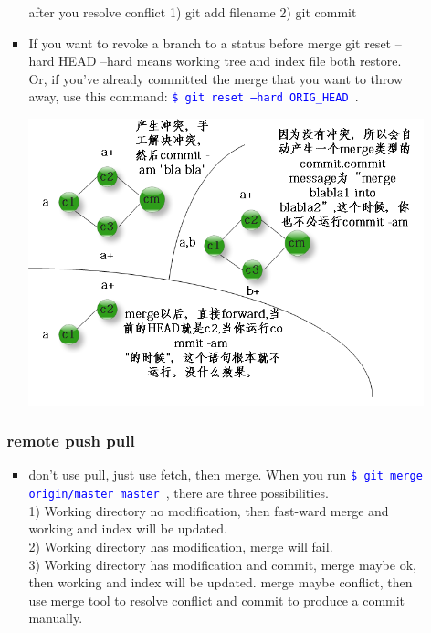 \documentclass[a4paper,12pt,twoside]{book}
\newcommand{\linuxcommand}[1]{\texttt{\textcolor{blue}{\$ #1 \Pisymbol{psy}{191}}}}
\begin{document}
\begin{itemize}
\begin{itemize}
\begin{itemize}
after you resolve conflict 1) git add filename 2) git commit


\item If you want to revoke a branch to a status before merge 
git reset --hard HEAD --hard means working tree and index file both restore.
Or, if you've already committed the merge that you want to throw away, use this command: \linuxcommand{git reset --hard ORIG\_HEAD}.

\includegraphics[scale=0.5]{pics/git-merge} \\
\end{itemize}

\subsubsection{remote push pull}
\begin{itemize}

\item don't use pull, just use fetch, then merge. 
When you run \linuxcommand{git merge origin/master master}, there are three possibilities. \\
1) Working directory no modification, then fast-ward merge and working and index will be updated. \\
2) Working directory has modification, merge will fail. \\
3) Working directory has modification and commit, merge maybe ok, then working and index will be updated. merge maybe conflict, then use merge tool to resolve conflict and commit to produce a commit manually. \\


\end{itemize}
\end{itemize}
\end{itemize}
\end{document}

